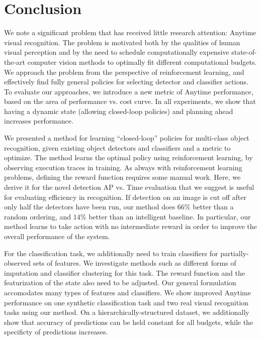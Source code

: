 \chapter{Conclusion}\label{sec:conclusion}

We note a significant problem that has received little research attention: Anytime visual recognition.
The problem is motivated both by the qualities of human visual perception and by the need to schedule computationally expensive state-of-the-art computer vision methods  to optimally fit different computational budgets.
We approach the problem from the perspective of reinforcement learning, and effectively find fully general policies for selecting detector and classifier actions.
To evaluate our approaches, we introduce a new metric of Anytime performance, based on the area of performance vs. cost curve.
In all experiments, we show that having a dynamic state (allowing closed-loop policies) and planning ahead increases performance.

We presented a method for learning ``closed-loop'' policies for multi-class object recognition, given existing object detectors and classifiers and a metric to optimize.
The method learns the optimal policy using reinforcement learning, by observing execution traces in training.
As always with reinforcement learning problems, defining the reward function requires some manual work.
Here, we derive it for the novel detection AP vs. Time evaluation that we suggest is useful for evaluating efficiency in recognition.
If detection on an image is cut off after only half the detectors have been run, our method does $66\%$ better than a random ordering, and $14\%$ better than an intelligent baseline.
In particular, our method learns to take action with no intermediate reward in order to improve the overall performance of the system.

For the classification task, we additionally need to train classifiers for partially-observed sets of features.
We investigate methods such as different forms of imputation and classifier clustering for this task.
The reward function and the featurization of the state also need to be adjusted.
Our general formulation accomodates many types of features and classifiers.
We show improved Anytime performance on one synthetic classification task and two real visual recognition tasks using our method.
On a hierarchically-structured dataset, we additionally show that accuracy of predictions can be held constant for all budgets, while the specificty of predictions increases.

